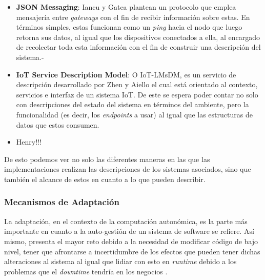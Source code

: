 \documentclass[12pt]{article}
\begin{document}
    \begin{itemize}
        \item \textbf{JSON Messaging}: Iancu y Gatea \citeyear{Iancu_2022} plantean un protocolo que emplea mensajería entre \textit{gateways} con el fin de recibir información sobre estas. En términos simples, estas funcionan como un \textit{ping} hacia el nodo que luego retorna sus datos, al igual que los dispositivos conectados a ella, al encargado de recolectar toda esta información con el fin de construir una descripción del sistema.-
        
        \item \textbf{IoT Service Description Model}: O IoT-LMsDM, es un servicio de descripción desarrollado por Zhen y Aiello \citeyear{Wang_2021} el cual está orientado al contexto, servicios e interfaz de un sistema IoT. De este se espera poder contar no solo con descripciones del estado del sistema en términos del ambiente, pero la funcionalidad (es decir, los \textit{endpoints} a usar) al igual que las estructuras de datos que estos consumen.
        
        \item Henry!!!
    \end{itemize}

    De esto podemos ver no solo las diferentes maneras en las que las implementaciones realizan las descripciones de los sistemas asociados, sino que también el alcance de estos en cuanto a lo que pueden describir.
    
    \subsubsection*{Mecanismos de Adaptación}
    

    La adaptación, en el contexto de la computación autonómica, es la parte más importante en cuanto a la auto-gestión de un sistema de software se refiere. Así mismo, presenta el mayor reto debido a la necesidad de modificar código de bajo nivel, tener que afrontarse a incertidumbre de los efectos que pueden tener dichas alteraciones al sistema al igual que lidiar con esto en \textit{runtime} debido a los problemas que el \textit{downtime} tendría en los negocios \cite{lalanda_diaconescu_mccann_2014}. 
    
\end{document}
